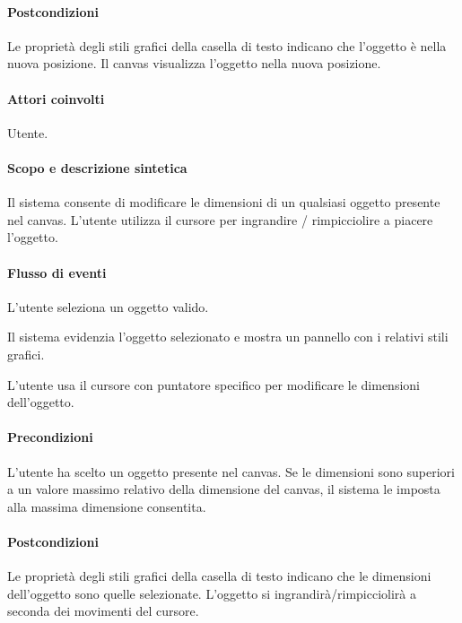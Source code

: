 \paragraph{Postcondizioni} Le propriet\`  a degli stili grafici della casella di testo indicano che l'oggetto \`e nella nuova posizione. Il canvas visualizza l'oggetto nella nuova posizione.

\paragraph{Attori coinvolti} Utente.
\paragraph{Scopo e descrizione sintetica}  Il sistema consente di modificare le dimensioni  di un qualsiasi oggetto presente nel canvas.  L'utente utilizza il cursore per ingrandire / rimpicciolire a piacere l'oggetto.
\paragraph{Flusso di eventi}
\begin{elenconumerato}[\textbf{}]{\subsubsecindent}
\item  L'utente seleziona un oggetto valido.
\item  Il sistema evidenzia l'oggetto selezionato e mostra un pannello con i relativi stili grafici.
\item  L'utente usa il cursore con puntatore specifico per modificare le dimensioni dell'oggetto.
\end{elenconumerato}
\paragraph{Precondizioni} L'utente ha scelto un oggetto presente nel canvas. Se le dimensioni sono superiori a un valore massimo relativo della dimensione del canvas, il sistema le imposta alla massima dimensione consentita.
\paragraph{Postcondizioni} Le propriet\`a  degli stili grafici della casella di testo indicano che le dimensioni dell'oggetto sono quelle selezionate. L'oggetto si ingrandir\` a/rimpicciolir\`a  a seconda dei movimenti del cursore.


